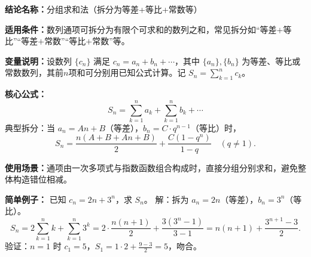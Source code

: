 \textbf{结论名称：}分组求和法（拆分为等差+等比+常数等）

\textbf{适用条件：}数列通项可拆分为有限个可求和的数列之和，常见拆分如“等差$+$等比”“等差$+$常数”“等比$+$常数”等。

\textbf{变量说明：}设数列 $\{c_n\}$ 满足 $c_n=a_n+b_n+\cdots$，其中 $\{a_n\},\{b_n\}$ 为等差、等比或常数数列，其前$n$项和可分别用已知公式计算。记 $S_n=\sum_{k=1}^{n}c_k$。

\textbf{核心公式：}
\[
\boxed{S_n = \sum_{k=1}^{n} a_k + \sum_{k=1}^{n} b_k + \cdots}
\]
典型拆分：当 $a_n=An+B$（等差），$b_n=C\cdot q^{n-1}$（等比）时，
\[
S_n = \frac{n(A+B+An+B)}{2} + \frac{C(1-q^{n})}{1-q}\quad(q\neq1).
\]

\textbf{使用场景：}通项由一次多项式与指数函数组合构成时，直接分组分别求和，避免整体构造错位相减。

\textbf{简单例子：}
已知 $c_n = 2n + 3^n$，求 $S_n$。
解：拆为 $a_n=2n$（等差），$b_n=3^n$（等比）。
\[
S_n = 2\sum_{k=1}^{n} k + \sum_{k=1}^{n} 3^k = 2\cdot\frac{n(n+1)}{2} + \frac{3(3^{n}-1)}{3-1} = n(n+1) + \frac{3^{n+1}-3}{2}.
\]
验证：$n=1$ 时 $c_1=5$，$S_1=1\cdot2+\frac{9-3}{2}=5$，吻合。